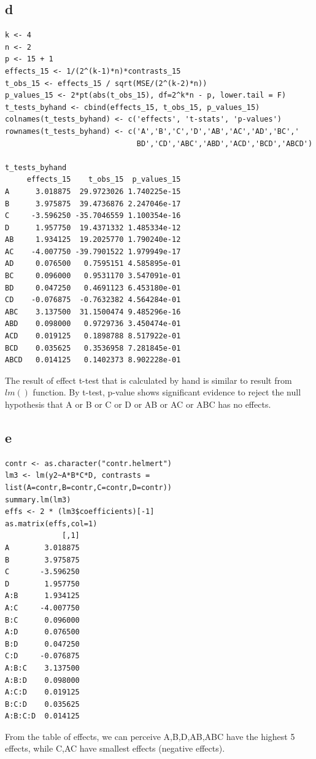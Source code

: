 \documentclass[11pt,letterpaper]{article}
\begin{document}
\subsection*{d}
\begin{verbatim}
k <- 4
n <- 2
p <- 15 + 1
effects_15 <- 1/(2^(k-1)*n)*contrasts_15
t_obs_15 <- effects_15 / sqrt(MSE/(2^(k-2)*n))
p_values_15 <- 2*pt(abs(t_obs_15), df=2^k*n - p, lower.tail = F)
t_tests_byhand <- cbind(effects_15, t_obs_15, p_values_15)
colnames(t_tests_byhand) <- c('effects', 't-stats', 'p-values')
rownames(t_tests_byhand) <- c('A','B','C','D','AB','AC','AD','BC','
                              BD','CD','ABC','ABD','ACD','BCD','ABCD')
                              
t_tests_byhand
     effects_15    t_obs_15  p_values_15
A      3.018875  29.9723026 1.740225e-15
B      3.975875  39.4736876 2.247046e-17
C     -3.596250 -35.7046559 1.100354e-16
D      1.957750  19.4371332 1.485334e-12
AB     1.934125  19.2025770 1.790240e-12
AC    -4.007750 -39.7901522 1.979949e-17
AD     0.076500   0.7595151 4.585895e-01
BC     0.096000   0.9531170 3.547091e-01
BD     0.047250   0.4691123 6.453180e-01
CD    -0.076875  -0.7632382 4.564284e-01
ABC    3.137500  31.1500474 9.485296e-16
ABD    0.098000   0.9729736 3.450474e-01
ACD    0.019125   0.1898788 8.517922e-01
BCD    0.035625   0.3536958 7.281845e-01
ABCD   0.014125   0.1402373 8.902228e-01
\end{verbatim}

\noindent The result of effect t-test that is calculated by hand is similar to result from $lm()$ function. By t-test, p-value shows significant evidence to reject the null hypothesis that A or B or C or D or AB or AC or ABC has no effects. 

\subsection*{e}
\begin{verbatim}
contr <- as.character("contr.helmert")
lm3 <- lm(y2~A*B*C*D, contrasts = list(A=contr,B=contr,C=contr,D=contr))
summary.lm(lm3) 
effs <- 2 * (lm3$coefficients)[-1]
as.matrix(effs,col=1)
             [,1]
A        3.018875
B        3.975875
C       -3.596250
D        1.957750
A:B      1.934125
A:C     -4.007750
B:C      0.096000
A:D      0.076500
B:D      0.047250
C:D     -0.076875
A:B:C    3.137500
A:B:D    0.098000
A:C:D    0.019125
B:C:D    0.035625
A:B:C:D  0.014125
\end{verbatim}

\noindent From the table of effects, we can perceive A,B,D,AB,ABC have the highest 5 effects, while C,AC have smallest effects (negative effects). 
\end{document}
